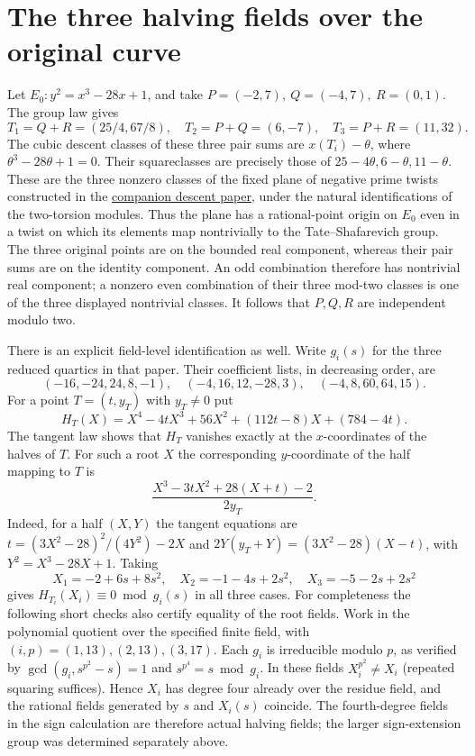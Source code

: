 \documentclass[11pt]{article}
\begin{document}
\section{The three halving fields over the original curve}

Let $E_0:y^2=x^3-28x+1$, and take
$P=(-2,7),\ Q=(-4,7),\ R=(0,1)$. The group law gives
\[
 T_1=Q+R=(25/4,67/8),\quad T_2=P+Q=(6,-7),\quad
 T_3=P+R=(11,32).
\]
The cubic descent classes of these three pair sums are
$x(T_i)-\theta$, where $\theta^3-28\theta+1=0$.
Their squareclasses are precisely those of
$25-4\theta,6-\theta,11-\theta$. These are the three nonzero
classes of the fixed plane of negative prime twists constructed
in the \href{https://github.com/cosmosgeek0/BSD/blob/main/fisher-twist-rank-zero.pdf}{companion descent paper},
under the natural identifications of the two-torsion modules. Thus
the plane has a rational-point origin on $E_0$ even in a twist
on which its elements map nontrivially to the Tate--Shafarevich
group. The three original points are on the bounded real component,
whereas their pair sums are on the identity component.
An odd combination therefore has nontrivial real component;
a nonzero even combination of their three mod-two classes is one
of the three displayed nontrivial classes. It follows that
$P,Q,R$ are independent modulo two.

There is an explicit field-level identification as well.
Write $g_i(s)$ for the three reduced quartics in that paper.
Their coefficient lists, in decreasing order, are
\[
 (-16,-24,24,8,-1),\quad
 (-4,16,12,-28,3),\quad
 (-4,8,60,64,15).
\]
For a point $T=(t,y_T)$ with $y_T\ne0$ put
\[
 H_T(X)=X^4-4tX^3+56X^2+(112t-8)X+(784-4t).
\]
The tangent law shows that $H_T$ vanishes exactly at the
$x$-coordinates of the halves of $T$. For such a root $X$ the
corresponding $y$-coordinate of the half mapping to $T$ is
\[
 \frac{X^3-3tX^2+28(X+t)-2}{2y_T}.
\]
Indeed, for a half $(X,Y)$ the tangent equations are
$t=(3X^2-28)^2/(4Y^2)-2X$ and
$2Y(y_T+Y)=(3X^2-28)(X-t)$, with $Y^2=X^3-28X+1$.
Taking
\[
 X_1=-2+6s+8s^2,\quad X_2=-1-4s+2s^2,\quad X_3=-5-2s+2s^2
\]
gives $H_{T_i}(X_i)\equiv0\bmod g_i(s)$ in all three cases.
For completeness the following short checks also certify equality
of the root fields. Work in the polynomial quotient over the
specified finite field, with $(i,p)=(1,13),(2,13),(3,17)$.
Each $g_i$ is irreducible modulo $p$, as verified by
$\gcd(g_i,s^{p^2}-s)=1$ and $s^{p^4}=s\bmod g_i$.
In these fields $X_i^{p^2}\ne X_i$ (repeated squaring suffices).
Hence $X_i$ has degree four already over the residue field, and
the rational fields generated by $s$ and $X_i(s)$ coincide.
The fourth-degree fields in the sign calculation are therefore
actual halving fields; the larger sign-extension group was
determined separately above.
\end{document}
